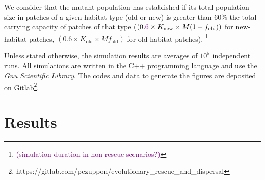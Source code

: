 \documentclass[a4paper,11pt]{article}
\newcommand{\florence}[1]{\textcolor{purple}{(#1)}} %
\newcommand{\chg}[1]{\textcolor{change}{#1}}
\begin{document}

We consider that the mutant population has established if its total population size in patches of a given habitat type (old or new) is greater than $60\%$ the total carrying capacity of patches of that type ($(0.\chg{6} \times K_{\text{new}} \times M(1- f_{\text{old}}))$ for new-habitat patches, $(0.6\times K_{\text{old}}\times M f_{\text{old}})$  for old-habitat patches). \footnote{\florence{simulation duration in non-rescue scenarios?}}

Unless stated otherwise, the simulation results are averages of $10^5$ independent runs. All simulations are written in the C++ programming language and use the \textit{Gnu Scientific Library}. The codes and data to generate the figures are deposited on Gitlab\footnote{https://gitlab.com/pczuppon/evolutionary\_rescue\_and\_dispersal}.

\section*{Results}
\end{document}

